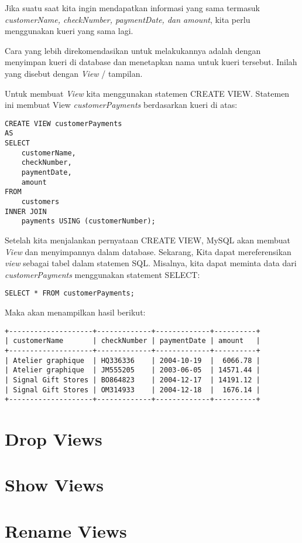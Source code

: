 \documentclass[a4paper]{article}
\begin{document}
Jika suatu saat kita ingin mendapatkan informasi yang sama termasuk \textit{customerName, checkNumber, paymentDate, dan amount}, kita perlu menggunakan kueri yang sama lagi.

Cara yang lebih direkomendasikan untuk melakukannya adalah dengan menyimpan kueri di database dan menetapkan nama untuk kueri tersebut. Inilah yang disebut dengan \textit{View} / tampilan.

Untuk membuat \textit{View} kita menggunakan statemen CREATE VIEW. Statemen ini membuat View \textit{customerPayments} berdasarkan kueri di atas:

\begin{lstlisting}
CREATE VIEW customerPayments
AS 
SELECT 
    customerName, 
    checkNumber, 
    paymentDate, 
    amount
FROM
    customers
INNER JOIN
    payments USING (customerNumber);
\end{lstlisting}


Setelah kita menjalankan pernyataan CREATE VIEW, MySQL akan membuat \textit{View} dan menyimpannya dalam database. Sekarang, Kita dapat mereferensikan \textit{view} sebagai tabel dalam statemen SQL. Misalnya, kita dapat meminta data dari \textit{customerPayments} menggunakan statement SELECT:

\begin{lstlisting}
SELECT * FROM customerPayments;
\end{lstlisting}


Maka akan menampilkan hasil berikut:
\begin{lstlisting}
+--------------------+-------------+-------------+----------+
| customerName       | checkNumber | paymentDate | amount   |
+--------------------+-------------+-------------+----------+
| Atelier graphique  | HQ336336    | 2004-10-19  |  6066.78 |
| Atelier graphique  | JM555205    | 2003-06-05  | 14571.44 |
| Signal Gift Stores | BO864823    | 2004-12-17  | 14191.12 |
| Signal Gift Stores | OM314933    | 2004-12-18  |  1676.14 |
+--------------------+-------------+-------------+----------+
\end{lstlisting}

\section{Drop Views}%
\label{sec:section_name}

\section{Show Views}%
\label{sec:show_views}

\section{Rename Views}%
\label{sec:rename_views}
\end{document}
